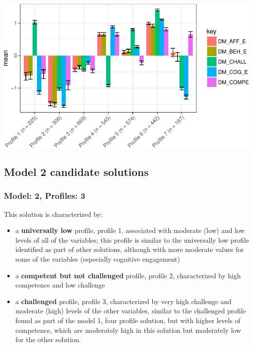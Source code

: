 \documentclass[]{msu-thesis}
\providecommand{\tightlist}{%
  \setlength{\itemsep}{0pt}\setlength{\parskip}{0pt}}
\theoremstyle{definition}
\theoremstyle{definition}
\theoremstyle{definition}
\theoremstyle{remark}
\begin{document}
\begin{center}\includegraphics[width=0.8\linewidth]{rosenberg-dissertation_files/figure-latex/m1_7-other-LL-p-1} \end{center}

\subsection{Model 2 candidate
solutions}\label{model-2-candidate-solutions}

\subsubsection{Model: 2, Profiles: 3}\label{model-2-profiles-3}

This solution is characterized by:

\begin{itemize}
\tightlist
\item
  a \textbf{universally low} profile, profile 1, associated with
  moderate (low) and low levels of all of the variables; this profile is
  similar to the universally low profile identified as part of other
  solutions, although with more moderate values for some of the
  variables (especially cognitive engagement)
\item
  a \textbf{competent but not challenged} profile, profile 2,
  characterized by high competence and low challenge
\item
  a \textbf{challenged} profile, profile 3, characterized by very high
  challenge and moderate (high) levels of the other variables, similar
  to the challenged profile found as part of the model 1, four profile
  solution, but with higher levels of competence, which are moderately
  high in this solution but moderately low for the other solution.
\end{itemize}
\end{document}
